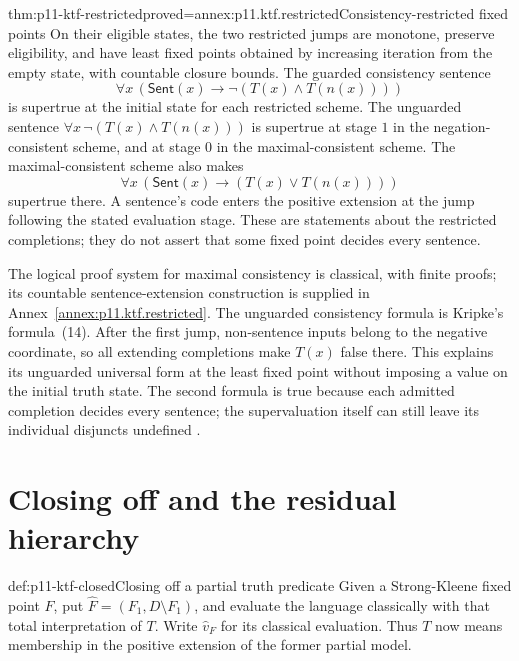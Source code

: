 \begin{hbtheorem}{thm:p11-ktf-restricted}{proved=annex:p11.ktf.restricted}{Consistency-restricted fixed points}
On their eligible states, the two restricted jumps are monotone, preserve
eligibility, and have least fixed points obtained by increasing iteration
from the empty state, with countable closure bounds.
The guarded consistency sentence
\[
 \forall x\,(\mathsf{Sent}(x)\to\neg(T(x)\land T(n(x))))
\]
is supertrue at the initial state for each restricted scheme.
The unguarded sentence \(\forall x\,\neg(T(x)\land T(n(x)))\)
is supertrue at stage \(1\) in the negation-consistent scheme, and
at stage \(0\) in the maximal-consistent scheme.
The maximal-consistent scheme also makes
\[
 \forall x\,(\mathsf{Sent}(x)\to(T(x)\lor T(n(x))))
\]
supertrue there. A sentence's code enters the positive extension at the
jump following the stated evaluation stage.
These are statements about the restricted completions;
they do not assert that some fixed point decides every sentence.
\end{hbtheorem}

The logical proof system for maximal consistency is classical, with finite
proofs; its countable sentence-extension construction is supplied in
Annex~\ref{annex:p11.ktf.restricted}.
The unguarded consistency formula is Kripke's formula~(14).
After the first jump, non-sentence inputs belong to the negative
coordinate, so all extending completions make \(T(x)\) false there.
This explains its unguarded universal form at the least fixed point
without imposing a value on the initial truth state.
The second formula is true because each admitted completion decides
every sentence; the supervaluation itself can still leave its individual
disjuncts undefined \cite[pp.~711--712]{Kripke1975}.

\section{Closing off and the residual hierarchy}

\begin{hbdefinition}{def:p11-ktf-closed}{Closing off a partial truth predicate}
Given a Strong-Kleene fixed point \(F\), put
\(\widehat F=(F_1,D\setminus F_1)\), and evaluate the language
classically with that total interpretation of \(T\). Write
\(\widehat v_F\) for its classical evaluation. Thus \(T\) now
means membership in the positive extension of the former partial model.
\end{hbdefinition}

